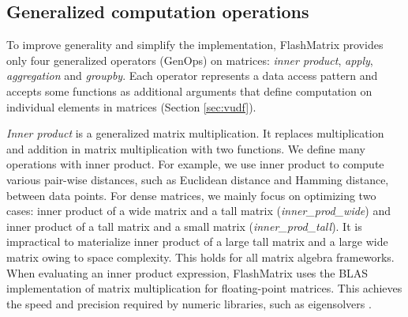 


\subsection{Generalized computation operations} \label{sec:genop}
To improve generality and simplify the implementation, FlashMatrix provides
only four generalized operators (GenOps) on matrices: \textit{inner product},
\textit{apply}, \textit{aggregation} and \textit{groupby}. Each operator
represents a data access pattern and accepts some functions as additional
arguments that define computation
on individual elements in matrices (Section \ref{sec:vudf}).

\textit{Inner product} is a generalized matrix multiplication. It replaces
multiplication and addition in matrix multiplication with two functions.
We define many operations with inner product. For example, we use inner product
to compute various pair-wise distances, such as Euclidean distance and Hamming
distance, between data points. For dense matrices, we mainly focus on
optimizing two cases: inner product of a wide matrix and a tall matrix (\textit{inner\_prod\_wide}) and inner product of a tall matrix and a small
matrix (\textit{inner\_prod\_tall}). It is impractical to
materialize inner product of a large tall matrix and a large wide matrix owing
to space complexity. This holds for all matrix algebra frameworks.
When evaluating an inner product expression, FlashMatrix uses the BLAS 
implementation of matrix multiplication for floating-point matrices.
This achieves the speed and precision required by
numeric libraries, such as eigensolvers \cite{anasazi, FlashEigen}.

